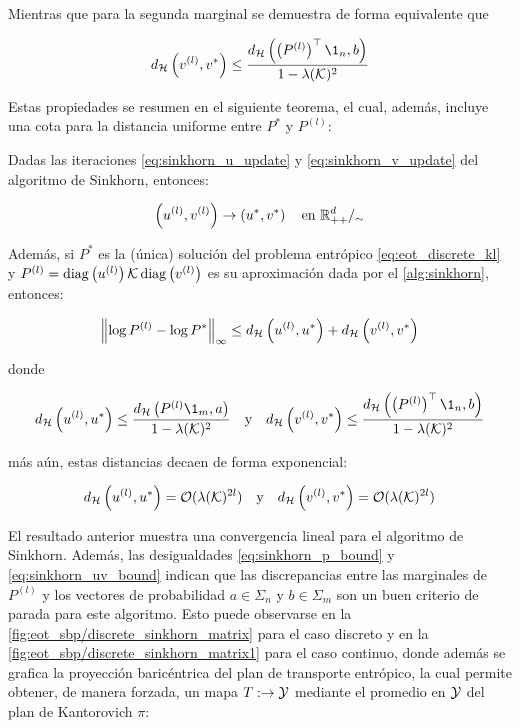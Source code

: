 Mientras que para la segunda marginal se demuestra de forma equivalente que

\begin{equation*}
	\hmetric{v^{(l)}}{v^*}
	\leq \frac{\hmetric{\parent{P^{(l)}}^\top\1_n}{b}}{1-\lambda(\gibbs)^2}
\end{equation*}


Estas propiedades se resumen en el siguiente teorema, el cual, además, incluye una cota para la distancia uniforme entre $P^*$ y $P^{(l)}$:

\begin{teo}
	\label{teo:sinkhorn_convergence}
	Dadas las iteraciones \eqref{eq:sinkhorn_u_update} y \eqref{eq:sinkhorn_v_update} del algoritmo de Sinkhorn, entonces:

	\begin{equation*}
		\left(u^{(l)},v^{(l)}\right) \to \left(u^*,v^*\right)
		\quad\text{en }\mathbb{R}^{d}_{++}/_\sim
	\end{equation*}

	Además, si $P^*$ es la (única) solución del problema entrópico \eqref{eq:eot_discrete_kl} y $P^{(l)} = \operatorname{diag}\left(u^{(l)}\right)\mathcal{K}\operatorname{diag}\left(v^{(l)}\right)$ es su aproximación dada por el \autoref{alg:sinkhorn}, entonces:

	\begin{equation}
		\label{eq:sinkhorn_p_bound}
		\left\lVert \log P^{(l)} - \log P^* \right\rVert_\infty \leq d_{\mathcal{H}}\left(u^{(l)},u^*\right) + d_{\mathcal{H}}\left(v^{(l)},v^*\right)
	\end{equation}

	donde

	\begin{equation}
		\label{eq:sinkhorn_uv_bound}
		\hmetric{u^{(l)}}{u^*}\leq\frac{\hmetric{P^{(l)}\1_m}{a}}{1-\lambda(\gibbs)^2}
		\quad\text{y}\quad
		\hmetric{v^{(l)}}{v^*}\leq \frac{\hmetric{\parent{P^{(l)}}^\top\1_n}{b}}{1-\lambda(\gibbs)^2}
	\end{equation}

	más aún, estas distancias decaen de forma exponencial:

	\begin{equation*}
		d_{\mathcal{H}}\left(u^{(l)},u^*\right) = \mathcal{O}(\lambda(\mathcal{K})^{2l})
		\quad\text{y}\quad
		d_{\mathcal{H}}\left(v^{(l)},v^*\right) = \mathcal{O}(\lambda(\mathcal{K})^{2l})
	\end{equation*}

\end{teo}

El resultado anterior muestra una convergencia lineal para el algoritmo de Sinkhorn. Además, las desigualdades \eqref{eq:sinkhorn_p_bound} y \eqref{eq:sinkhorn_uv_bound} indican que las discrepancias entre las marginales de $P^{(l)}$ y los vectores de probabilidad $a\in\Sigma_n$ y $b\in\Sigma_m$ son un buen criterio de parada para este algoritmo. Esto puede observarse en la \autoref{fig:eot_sbp/discrete_sinkhorn_matrix} para el caso discreto y en la \autoref{fig:eot_sbp/discrete_sinkhorn_matrix1} para el caso continuo, donde además se grafica la proyección baricéntrica del plan de transporte entrópico, la cual permite obtener, de manera forzada, un mapa $T:\to\mathcal{Y}$ mediante el promedio en $\mathcal{Y}$ del plan de Kantorovich $\pi$:

